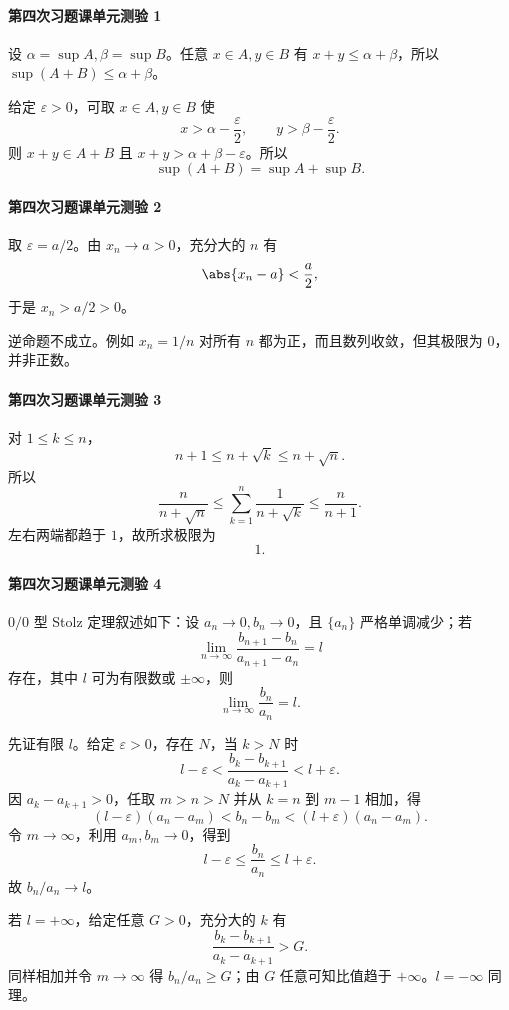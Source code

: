 \paragraph{第四次习题课单元测验 1}
\begin{xsolution}
设 $\alpha=\sup A,\beta=\sup B$。任意 $x\in A,y\in B$ 有 $x+y\le\alpha+\beta$，所以 $\sup(A+B)\le\alpha+\beta$。

给定 $\varepsilon>0$，可取 $x\in A,y\in B$ 使
\[
  x>\alpha-\frac\varepsilon2,
  \qquad y>\beta-\frac\varepsilon2.
\]
则 $x+y\in A+B$ 且 $x+y>\alpha+\beta-\varepsilon$。所以
\[
  \boxed{\sup(A+B)=\sup A+\sup B}.
\]
\end{xsolution}

\paragraph{第四次习题课单元测验 2}
\begin{xsolution}
取 $\varepsilon=a/2$。由 $x_n\to a>0$，充分大的 $n$ 有
\[
  \abs{x_n-a}<\frac a2,
\]
于是 $x_n>a/2>0$。

逆命题不成立。例如 $x_n=1/n$ 对所有 $n$ 都为正，而且数列收敛，但其极限为 $0$，并非正数。
\end{xsolution}

\paragraph{第四次习题课单元测验 3}
\begin{xsolution}
对 $1\le k\le n$，
\[
  n+1\le n+\sqrt k\le n+\sqrt n.
\]
所以
\[
  \frac n{n+\sqrt n}
  \le\sum_{k=1}^n\frac1{n+\sqrt k}
  \le\frac n{n+1}.
\]
左右两端都趋于 $1$，故所求极限为
\[
  \boxed{1}.
\]
\end{xsolution}

\paragraph{第四次习题课单元测验 4}
\begin{xsolution}
$0/0$ 型 Stolz 定理叙述如下：设 $a_n\to0,b_n\to0$，且 $\{a_n\}$ 严格单调减少；若
\[
  \lim_{n\to\infty}
  \frac{b_{n+1}-b_n}{a_{n+1}-a_n}=l
\]
存在，其中 $l$ 可为有限数或 $\pm\infty$，则
\[
  \lim_{n\to\infty}\frac{b_n}{a_n}=l.
\]

先证有限 $l$。给定 $\varepsilon>0$，存在 $N$，当 $k>N$ 时
\[
  l-\varepsilon<
  \frac{b_k-b_{k+1}}{a_k-a_{k+1}}
  <l+\varepsilon.
\]
因 $a_k-a_{k+1}>0$，任取 $m>n>N$ 并从 $k=n$ 到 $m-1$ 相加，得
\[
  (l-\varepsilon)(a_n-a_m)
  <b_n-b_m
  <(l+\varepsilon)(a_n-a_m).
\]
令 $m\to\infty$，利用 $a_m,b_m\to0$，得到
\[
  l-\varepsilon\le\frac{b_n}{a_n}\le l+\varepsilon.
\]
故 $b_n/a_n\to l$。

若 $l=+\infty$，给定任意 $G>0$，充分大的 $k$ 有
\[
  \frac{b_k-b_{k+1}}{a_k-a_{k+1}}>G.
\]
同样相加并令 $m\to\infty$ 得 $b_n/a_n\ge G$；由 $G$ 任意可知比值趋于 $+\infty$。$l=-\infty$ 同理。
\end{xsolution}

